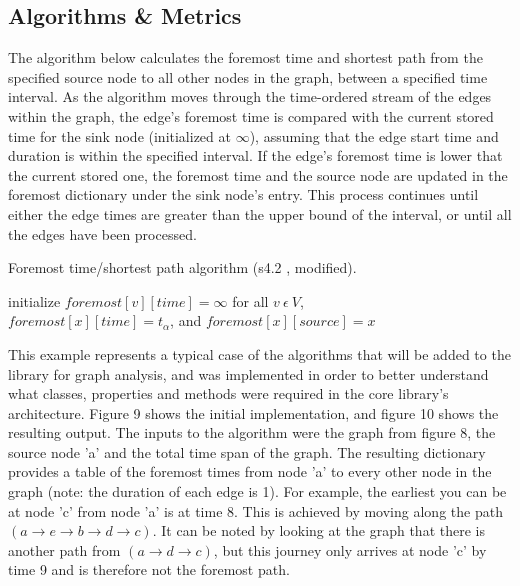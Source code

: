 \begin{design}
\subsection{Algorithms \& Metrics}
The algorithm below calculates the foremost time and shortest path from the specified source node to all other nodes in the graph, between a specified time interval. As the algorithm moves through the time-ordered stream of the edges within the graph, the edge's foremost time is compared with the current stored time for the sink node (initialized at $\infty$), assuming that the edge start time and duration is within the specified interval. If the edge's foremost time is lower that the current stored one, the foremost time and the source node are updated in the foremost dictionary under the sink node's entry. This process continues until either the edge times are greater than the upper bound of the interval, or until all the edges have been processed.\\
\vspace{0.1cm}
\begin{algorithm}[H]
\SetAlgoLined
\caption{Foremost time/shortest path algorithm (s4.2 \cite{efficient_algorithms}, modified).}
 initialize $foremost[v][time]=\infty$ for all $v\ \epsilon\ V$, \\
 \hspace{1.5cm}$foremost[x][time]=t_\alpha$, and $foremost[x][source]=x$\;
 \;
\end{algorithm}
\vspace{0.1cm}
This example represents a typical case of the algorithms that will be added to the library for graph analysis, and was implemented in order to better understand what classes, properties and methods were required in the core library's architecture. Figure 9 shows the initial implementation, and figure 10 shows the resulting output. The inputs to the algorithm were the graph from figure 8, the source node 'a' and the total time span of the graph. The resulting dictionary provides a table of the foremost times from node 'a' to every other node in the graph (note: the duration of each edge is 1). For example, the earliest you can be at node 'c' from node 'a' is at time 8. This is achieved by moving along the path $(a \to e \to b \to d \to c )$. It can be noted by looking at the graph that there is another path from $(a \to d \to c)$, but this journey only arrives at node 'c' by time 9 and is therefore not the foremost path.

\end{design}
